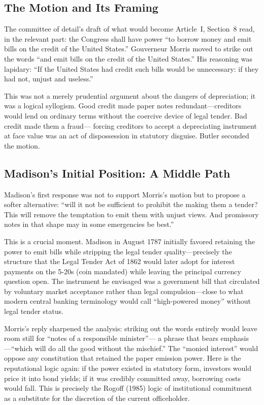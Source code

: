 \documentclass[12pt]{article}
\begin{document}
\subsection{The Motion and Its Framing}

The committee of detail's draft of what would become Article~I,
Section~8 read, in the relevant part: the Congress shall have power
``to borrow money and emit bills on the credit of the United States.''
Gouverneur Morris moved to strike out the words ``and emit bills on
the credit of the United States.'' His reasoning was lapidary:
``If the United States had credit such bills would be unnecessary:
if they had not, unjust and useless.''

This was not a merely prudential argument about the dangers of
depreciation; it was a logical syllogism. Good credit made paper
notes redundant---creditors would lend on ordinary terms without
the coercive device of legal tender. Bad credit made them a fraud---
forcing creditors to accept a depreciating instrument at face value
was an act of dispossession in statutory disguise. Butler seconded the
motion.

\subsection{Madison's Initial Position: A Middle Path}

Madison's first response was not to support Morris's motion but to
propose a softer alternative: ``will it not be sufficient to prohibit
the making them a tender? This will remove the temptation to emit them
with unjust views. And promissory notes in that shape may in some
emergencies be best.''

This is a crucial moment. Madison in August 1787 initially favored
retaining the power to emit bills while stripping the legal tender
quality---precisely the structure that the Legal Tender Act of 1862
would later adopt for interest payments on the 5-20s (coin mandated)
while leaving the principal currency question open. The instrument he
envisaged was a government bill that circulated by voluntary market
acceptance rather than legal compulsion---close to what modern central
banking terminology would call ``high-powered money'' without legal
tender status.

Morris's reply sharpened the analysis: striking out the words entirely
would leave room still for ``notes of a responsible minister''---
a phrase that bears emphasis---``which will do all the good without
the mischief.'' The ``monied interest'' would oppose any constitution
that retained the paper emission power. Here is the reputational logic
again: if the power existed in statutory form, investors would price
it into bond yields; if it was credibly committed away, borrowing
costs would fall. This is precisely the Rogoff (1985) logic of
institutional commitment as a substitute for the discretion of the
current officeholder.
\end{document}

